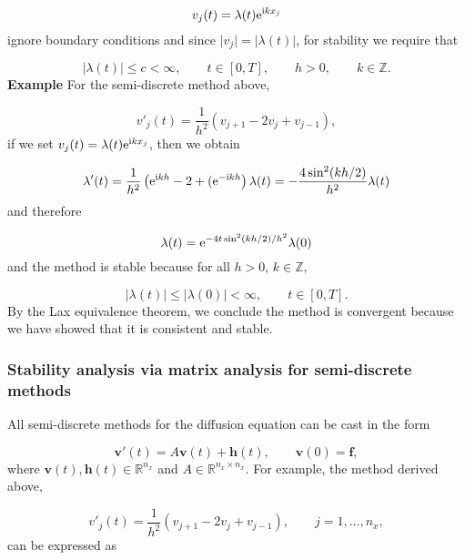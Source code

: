 \documentclass[12pt,landscape]{article}
\begin{document}
{\[
v_j(t) = \lambda(t){\rm e}^{{\rm i}kx_j}
\]
ignore boundary conditions and since $\vert v_j \vert = \vert\lambda(t) \vert$, for stability we require that

\[
\left\vert \lambda(t)\right \vert \leq c < \infty, \qquad t \in [0, T], \qquad h>0, \qquad k \in \mathbb{Z}.
\]
\textbf{Example} For the semi-discrete method above,

\[
v'_j(t) = \frac{1}{h^2}\left(v_{j+1} - 2v_j + v_{j-1}   \right),
\]
if we set $v_j(t) = \lambda(t){\rm e}^{{\rm i}kx_j}$, then we obtain

\[
\lambda'(t) = \frac{1}{h^2}\left({\rm e}^{{\rm i}kh} - 2 +   ({\rm e}^{-{\rm i}kh} \right)\lambda(t) = -\frac{4\sin^2(kh/2)}{h^2}\lambda(t)
\]
and therefore

\[
\lambda(t) = {\rm e}^{-4t\sin^2(kh/2)/h^2}\lambda(0) 
\]
and the method is stable because for all $h > 0$, $k \in \mathbb{Z}$,

\[
\vert \lambda(t) \vert \leq  \vert \lambda(0) \vert < \infty, \qquad   t \in [0, T].
\]
By the Lax equivalence theorem, we conclude the method is convergent because we have showed that it is consistent and stable.

\subsubsection{Stability analysis via matrix analysis for semi-discrete methods}
All semi-discrete methods for the diffusion equation can be cast in the form

\[
\mathbf{v}'(t) = A\mathbf{v}(t) + \mathbf{h}(t), \qquad \mathbf{v}(0) = \mathbf{f}, 
\]
where $\mathbf{v}(t), \mathbf{h}(t) \in \mathbb{R}^{n_x}$ and  $A \in \mathbb{R}^{n_x \times n_x}$.  For example, the method derived above,

\[
v'_j(t) = \frac{1}{h^2}\left(v_{j+1} - 2v_j + v_{j-1}   \right), \qquad j  = 1, \ldots, n_x,
\]
can be expressed as

}
\end{document}
